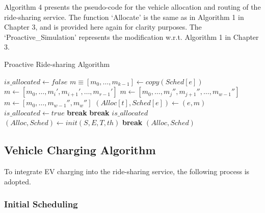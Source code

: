 Algorithm 4 presents the pseudo-code for the vehicle allocation and routing of the ride-sharing service. The function `Allocate' is the same as in Algorithm 1 in Chapter 3, and is provided here again for clarity purposes. The `Proactive\_Simulation' represents the modification w.r.t. Algorithm 1 in Chapter 3.

\begin{algorithm}
\caption{Proactive Ride-sharing Algorithm}
\begin{algorithmic}
    \State $is\_allocated \gets false$
    \State $m \equiv [ m_0, \ldots, m_{k-1} ] \gets copy(Sched[e])$
            \State $m \gets [ m_0, \ldots, m_i', m_{i+1}', \ldots, m_{r-1}' ]$
                    \State $m \gets [ m_0, \ldots, m_j'', m_{j+1}'', \ldots, m_{w-1}'' ]$
                        \State $m \gets [ m_0, \ldots, m_{w-1}'', m_w'' ]$
                        \State $(Alloc[t], Sched[e]) \gets (e, m)$
                        \State $is\_allocated \gets true$
                    \EndIf
                    \State \textbf{break}
                \EndIf
            \EndFor
            \State \textbf{break}
        \EndIf
    \EndFor
    \Return $is\_allocated$
\EndFunction
\\ \hrulefill
{}
    \State $(Alloc, Sched) \gets init(S, E, T, th)$
                \State \textbf{break}
            \EndIf
        \EndFor
    \EndFor
    \Return $(Alloc, Sched)$
\EndFunction
\end{algorithmic}
\end{algorithm}

\subsection{Vehicle Charging Algorithm}

To integrate EV charging into the ride-sharing service, the following process is adopted. 

\subsubsection{Initial Scheduling}

